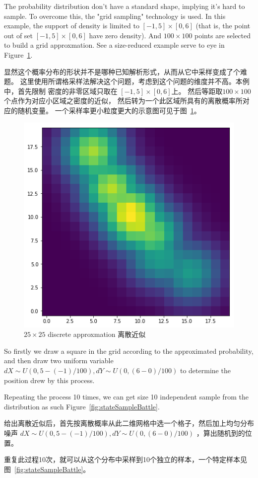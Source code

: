 \documentclass{article}
\begin{document}
The probability distribution don't have a standard shape, implying it's hard to sample. 
To overcome this, the "grid sampling" technology is used. In this example,
 the support of density is limited to $[-1,5] \times [0,6]$
(that is, the point out of set $[-1,5] \times [0,6]$ have zero density). 
And $100 \times 100$ points are selected to build a grid approxmation. 
See a size-reduced example serve to eye in Figure~\ref{fig:gridify}.

显然这个概率分布的形状并不是哪种已知解析形式，从而从它中采样变成了个难题。 
这里使用所谓格采样法解决这个问题，考虑到这个问题的维度并不高。本例中，首先限制
密度的非零区域只取在 $[-1,5] \times [0,6]$上。
然后等距取$100 \times 100$个点作为对应小区域之密度的近似，
然后转为一个此区域所具有的离散概率所对应的随机变量。
一个采样率更小粒度更大的示意图可见于图~\ref{fig:gridify}。


\begin{figure}[ht]
\includegraphics[width=0.6\linewidth]{gridify.png}
\caption{$25 \times 25$ discrete approxmation 离散近似}
\label{fig:gridify}
\end{figure}

So firstly we draw a square in the grid according to the approximated probability, 
and then draw two uniform variable $dX \sim U(0,5-(-1)/100),dY \sim U(0,(6-0)/100)$ 
to determine the position drew by this process.

Repeating the process 10 times, 
we can get size 10 independent sample from the distribution as such Figure~\ref{fig:stateSampleBattle}.

给出离散近似后，首先按离散概率从此二维网格中选一个格子，然后加上均匀分布噪声 
$dX \sim U(0,5-(-1)/100),dY \sim U(0,(6-0)/100)$ ，算出随机到的位置。

重复此过程10次，就可以从这个分布中采样到10个独立的样本，一个特定样本见图~\ref{fig:stateSampleBattle}。
\end{document}

